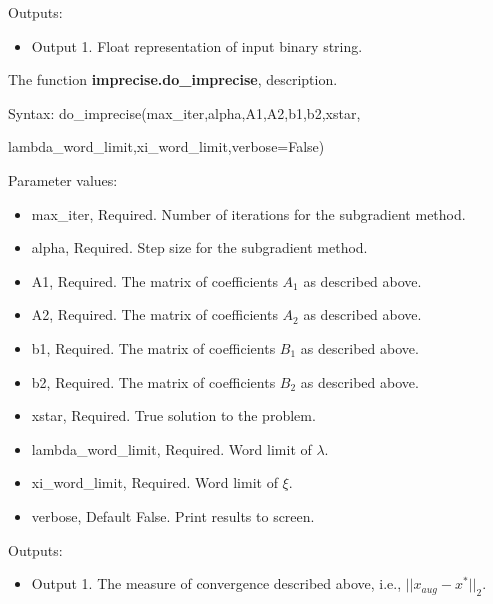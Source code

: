 \documentclass[12pt]{article}
\begin{document}
Outputs:
\begin{itemize}
	\item Output 1. Float representation of input binary string. 
\end{itemize}

\noindent The function \textbf{imprecise.do\_imprecise}, description.

Syntax: do\_imprecise(max\_iter,alpha,A1,A2,b1,b2,xstar,

\qquad\qquad\qquad\qquad lambda\_word\_limit,xi\_word\_limit,verbose=False)

Parameter values:
\begin{itemize}
	\item max\_iter, Required. Number of iterations for the subgradient method.
	\item alpha, Required. Step size for the subgradient method.
	\item A1, Required. The matrix of coefficients $A_1$ as described above.
	\item A2, Required. The matrix of coefficients $A_2$ as described above.
	\item b1, Required. The matrix of coefficients $B_1$ as described above.
	\item b2, Required. The matrix of coefficients $B_2$ as described above.
	\item xstar, Required. True solution to the problem.
	\item lambda\_word\_limit, Required. Word limit of $\lambda$.
	\item xi\_word\_limit, Required. Word limit of $\xi$.
	\item verbose, Default False. Print results to screen.
\end{itemize}

Outputs:
\begin{itemize}
	\item Output 1. The measure of convergence described above, i.e., $||x_{aug}-x^*||_2$.
\end{itemize}
\end{document}
